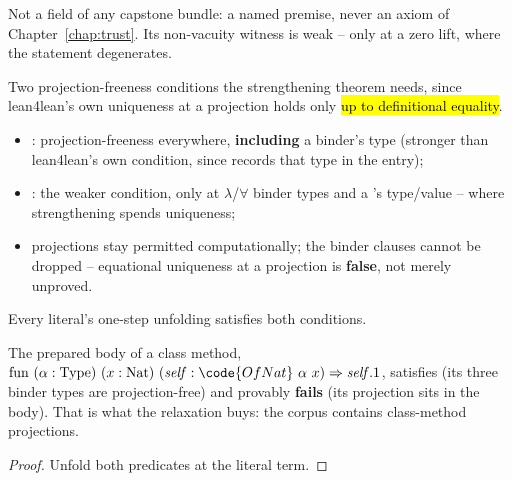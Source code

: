 \begin{remark}
 Not a field of any capstone bundle: a named premise, never an axiom of Chapter~\ref{chap:trust}. Its non-vacuity witness is weak -- only at a zero lift, where the statement degenerates.
\end{remark}

\begin{definition}
\label{def:NoProj}
\leanok
{}
 Two projection-freeness conditions the strengthening theorem needs, since lean4lean's own uniqueness at a projection holds only \hl{up to definitional equality}.
\begin{itemize}
\item {}: projection-freeness everywhere, \textbf{including} a  binder's type (stronger than lean4lean's own condition, since  records that type in the entry);
\item {}: the weaker condition, only at $\lambda$/$\forall$ binder types and a 's type/value -- where strengthening spends uniqueness;
\item projections stay permitted computationally; the binder clauses cannot be dropped -- equational uniqueness at a projection is \textbf{false}, not merely unproved.
\end{itemize}
 Every literal's one-step unfolding satisfies both conditions.
\end{definition}

\begin{lemma}
\label{lem:noProjBinders_ofNatBody}
\leanok
{}
 The prepared body of a class method, $\mathrm{fun}\ (\alpha : \mathrm{Type})\ (x : \mathrm{Nat})\ (\mathit{self} : \code{OfNat}\ \alpha\ x) \Rightarrow \mathit{self}.1$, satisfies  (its three binder types are projection-free) and provably \textbf{fails}  (its projection sits in the body). That is what the relaxation buys: the corpus contains class-method projections.
\end{lemma}
\begin{proof}
\leanok
{}
 Unfold both predicates at the literal term.
\end{proof}

